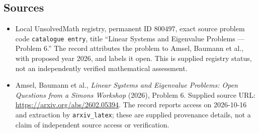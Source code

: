 \documentclass[11pt]{article}
\begin{document}
\subsection{Sources}
\begin{itemize}
\item Local UnsolvedMath registry, permanent ID \(800497\), exact source problem code \texttt{catalogue entry}, title ``Linear Systems and Eigenvalue Problems --- Problem 6.'' The record attributes the problem to Amsel, Baumann et al., with proposed year 2026, and labels it open. This is supplied registry status, not an independently verified mathematical assessment.
\item Amsel, Baumann et al., \emph{Linear Systems and Eigenvalue Problems: Open Questions from a Simons Workshop} (2026), Problem 6. Supplied source URL: \url{https://arxiv.org/abs/2602.05394}. The record reports access on 2026-10-16 and extraction by \texttt{arxiv\_latex}; these are supplied provenance details, not a claim of independent source access or verification.
\end{itemize}
\end{document}
